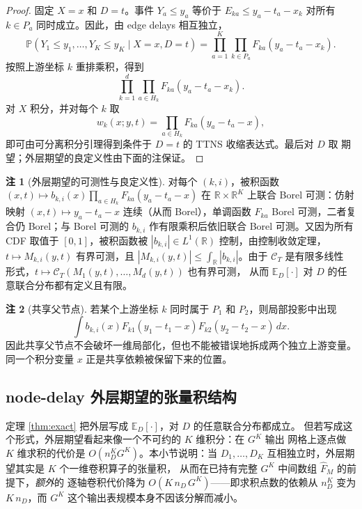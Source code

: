 \documentclass[a4paper,11pt]{article}
\theoremstyle{definition}
\newtheorem{remark}{注}
\newcommand{\R}{\mathbb R}
\newcommand{\E}{\mathbb E}
\newcommand{\Prob}{\mathbb P}
\newcommand{\1}{\mathbf 1}
\begin{document}
\begin{proof}
固定 $X=x$ 和 $D=t$。事件 $Y_a\le y_a$ 等价于
$E_{ka}\le y_a-t_a-x_k$ 对所有 $k\in P_a$ 同时成立。因此，由 edge delays
相互独立，
\[
\Prob(Y_1\le y_1,\ldots,Y_K\le y_K\mid X=x,D=t)
=
\prod_{a=1}^{K}\prod_{k\in P_a}F_{ka}(y_a-t_a-x_k).
\]
按照上游坐标 $k$ 重排乘积，得到
\[
\prod_{k=1}^{d}
\prod_{a\in H_k}F_{ka}(y_a-t_a-x_k).
\]
对 $X$ 积分，并对每个 $k$ 取
\[
w_k(x;y,t)=\prod_{a\in H_k}F_{ka}(y_a-t_a-x),
\]
即可由可分离积分引理得到条件于 $D=t$ 的 TTNS 收缩表达式。最后对 $D$ 取
期望；外层期望的良定义性由下面的注保证。
\end{proof}

\begin{remark}[外层期望的可测性与良定义性]
\label{rem:measurable}
对每个 $(k,i)$，被积函数 $(x,t)\mapsto b_{k,i}(x)\prod_{a\in H_k}
F_{ka}(y_a-t_a-x)$ 在 $\R\times\R^K$ 上联合 Borel 可测：仿射映射
$(x,t)\mapsto y_a-t_a-x$ 连续（从而 Borel），单调函数 $F_{ka}$ Borel
可测，二者复合仍 Borel；与 Borel 可测的 $b_{k,i}$ 作有限乘积后依旧联合
Borel 可测。又因为所有 CDF 取值于 $[0,1]$，被积函数被
$|b_{k,i}|\in L^1(\R)$ 控制，由控制收敛定理，
$t\mapsto M_{k,i}(y,t)$ 有界可测，且
$|M_{k,i}(y,t)|\le\int_\R|b_{k,i}|$。由于 $\mathcal C_T$ 是有限多线性
形式，$t\mapsto\mathcal C_T(M_1(y,t),\ldots,M_d(y,t))$ 也有界可测，
从而 $\E_D[\cdot]$ 对 $D$ 的任意联合分布都有定义且有限。
\end{remark}

\begin{remark}[共享父节点]
若某个上游坐标 $k$ 同时属于 $P_1$ 和 $P_2$，则局部投影中出现
\[
\int b_{k,i}(x)
F_{k1}(y_1-t_1-x)
F_{k2}(y_2-t_2-x)\,dx.
\]
因此共享父节点不会破坏一维局部化，但也不能被错误地拆成两个独立上游变量。
同一个积分变量 $x$ 正是共享依赖被保留下来的位置。
\end{remark}

\subsection{node-delay 外层期望的张量积结构}

定理 \ref{thm:exact} 把外层写成 $\E_D[\cdot]$，对 $D$ 的任意联合分布都成立。
但若写成这个形式，外层期望看起来像一个不可约的 $K$ 维积分：在 $G^K$ 输出
网格上逐点做 $K$ 维求积的代价是 $O(n_D^K G^K)$。本小节说明：当
$D_1,\ldots,D_K$ 互相独立时，外层期望其实是 $K$ 个一维卷积算子的张量积，
从而在已持有完整 $G^K$ 中间数组 $\widehat F_M$ 的前提下，\emph{额外}的
逐轴卷积代价降为 $O(K\,n_D\,G^K)$——即求积点数的依赖从 $n_D^K$ 变为
$K\,n_D$，而 $G^K$ 这个输出表规模本身不因该分解而减小。
\end{document}
